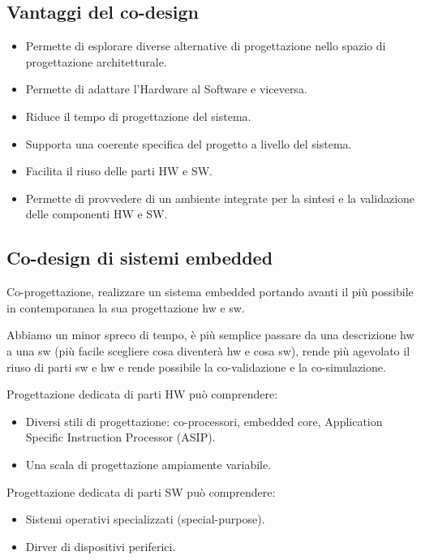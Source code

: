 \documentclass[a4paper]{article}
\begin{document}
	\subsection{Vantaggi del co-design}
		\begin{itemize}
			\item Permette di esplorare diverse alternative di progettazione nello spazio di progettazione architetturale.
			\item Permette di adattare l'Hardware al Software e viceversa.
			\item Riduce il tempo di progettazione del sistema.
			\item Supporta una coerente specifica del progetto a livello del sistema.
			\item Facilita il riuso delle parti HW e SW.
			\item Permette di provvedere di un ambiente integrate per la sintesi e la validazione delle componenti HW e SW.
		\end{itemize}
		
	\subsection{Co-design di sistemi embedded}
		Co-progettazione, realizzare un sistema embedded portando avanti il più possibile in contemporanea la sua progettazione hw e sw.
		
		\noindent
		Abbiamo un minor spreco di tempo, è più semplice passare da una descrizione hw a una sw (più facile scegliere cosa diventerà hw e cosa sw), rende più agevolato il riuso di parti sw e hw e rende possibile la co-validazione e la co-simulazione.
		
		\noindent
		Progettazione dedicata di parti HW può comprendere:
		\begin{itemize}
			\item Diversi stili di progettazione: co-processori, embedded core, Application Specific Instruction Processor (ASIP).
			\item Una scala di progettazione ampiamente variabile.
		\end{itemize}
		
		\noindent
		Progettazione dedicata di parti SW può comprendere:
		\begin{itemize}
			\item Sistemi operativi specializzati (special-purpose).
			\item Dirver di dispositivi periferici.
		\end{itemize}
		
\end{document}
